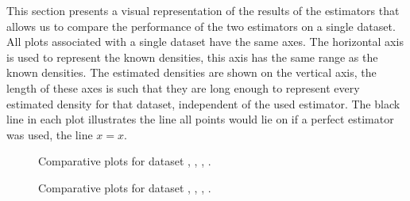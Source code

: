 This section presents a visual representation of the results of the estimators that allows us to compare the performance of the two estimators on a single dataset. All plots associated with a single dataset have the same axes. The horizontal axis is used to represent the known densities, this axis has the same range as the known densities. The estimated densities are shown on the vertical axis, the length of these axes is such that they are long enough to represent every estimated density for that dataset, independent of the used estimator. The black line in each plot illustrates the line all points would lie on if a perfect estimator was used, \ie the line $x = x$. 

\begin{figure*}
	\centering
	
	\caption{Comparative plots for dataset \ferdosiOne, \baakmanOne, \baakmanFour, \baakmanFive.}
	\label{fig:4:results:singleSphere}
\end{figure*}



\begin{figure*}
	\centering
	
	\caption{Comparative plots for dataset \ferdosiTwo, \ferdosiThree, \baakmanTwo, \baakmanThree.}
	\label{fig:4:resuts:multiSphere}
\end{figure*}


